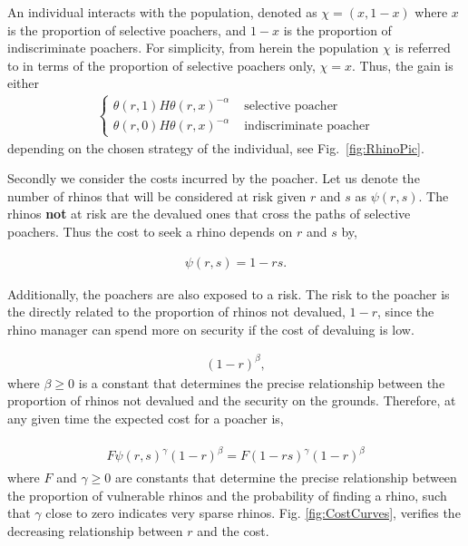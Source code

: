 \documentclass[10pt]{article}
\begin{document}
An individual interacts with the population, denoted as \(\chi=(x,1-x)\) where \(x\)
is the proportion of selective poachers, and \(1-x\) is the proportion of indiscriminate
poachers. For simplicity, from herein the population \(\chi\) is referred to in terms
of the proportion of selective poachers only, \(\chi=x\). Thus, the gain is either
\begin{eqnarray}
    \label{eqn:gain}
    \left\{
    \begin{array}{cl}
    \theta(r, 1) H \theta(r, x)^{-\alpha} & \mbox{ selective poacher}
    \\
    \theta(r, 0) H \theta(r, x)^{-\alpha} & \mbox{ indiscriminate poacher}
    \end{array} \right.
\end{eqnarray}
depending on the chosen strategy of the individual, see Fig.~\ref{fig:RhinoPic}.

Secondly we consider the costs incurred by the poacher. Let us denote the number
of rhinos that will be considered at risk given \(r\) and \(s\) as \(\psi(r,s)\).
The rhinos \textbf{not} at risk are the devalued ones 
that cross the paths of selective poachers. Thus the cost to seek a rhino depends 
on \(r\) and \(s\) by,

\begin{eqnarray}
    \label{eqn:psi}
    \psi(r, s) = 1 - rs.
\end{eqnarray}

Additionally, the poachers are also exposed to a risk. The risk to the poacher is
the directly related to the proportion of rhinos not devalued, \(1-r\), since the rhino manager
can spend more on security if the cost of devaluing is low.

\begin{eqnarray}
    \label{eqn:risk}
    (1 - r)^{\beta},
\end{eqnarray}
where \(\beta \geq 0\) is a constant that determines the precise relationship between
the proportion of rhinos not devalued and the security on the grounds. Therefore,
at any given time the expected cost for a poacher is, 

\begin{eqnarray}
    \label{eqn:individual_cost}
    \begin{array}{l}
    F \psi(r, s)^{\gamma} (1 - r)^{\beta} = F (1 - rs) ^{\gamma} (1 - r) ^{\beta}
    \end{array}
\end{eqnarray}
where \(F\) and \(\gamma \geq 0\) are constants that determine the precise relationship
between the proportion of vulnerable rhinos and the probability of finding a rhino,
such that \(\gamma\) close to zero indicates very sparse rhinos. Fig.
\ref{fig:CostCurves},  verifies the decreasing relationship between \(r\) and the
cost.
\end{document}
